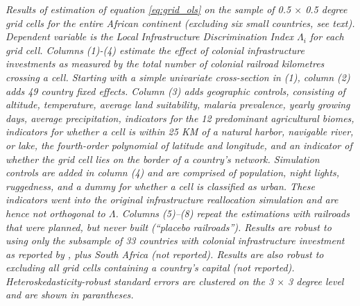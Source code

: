 \documentclass[11pt, oneside]{article}   	%
\newcommand{\mysubcaption}[1]{
\justify
\begin{spacing}{0.7}
\textit{\footnotesize #1}
\end{spacing}}
\begin{document}
\begin{table}[t]
\mysubcaption{Results of estimation of equation \eqref{eq:grid_ols} on the sample of 0.5 $\times$ 0.5 degree grid cells for the entire African continent (excluding six small countries, see text). Dependent variable is the Local Infrastructure Discrimination Index $\Lambda_{i}$ for each grid cell. Columns (1)-(4) estimate the effect of colonial infrastructure investments as measured by the total number of colonial railroad kilometres crossing a cell. Starting with a simple univariate cross-section in (1), column (2) adds 49 country fixed effects. Column (3) adds geographic controls, consisting of altitude, temperature, average land suitability, malaria prevalence, yearly growing days, average precipitation, indicators for the 12 predominant agricultural biomes, indicators for whether a cell is within 25 KM of a natural harbor, navigable river, or lake, the fourth-order polynomial of latitude and longitude, and an indicator of whether the grid cell lies on the border of a country's network. Simulation controls are added in column (4) and are comprised of population, night lights, ruggedness, and a dummy for whether a cell is classified as urban. These indicators went into the original infrastructure reallocation simulation and are hence not orthogonal to $\Lambda$. Columns (5)--(8) repeat the estimations with railroads that were planned, but never built (``placebo railroads''). Results are robust to using only the subsample of 33 countries with colonial infrastructure investment as reported by \cite{jedwab_permanent_2016}, plus South Africa (not reported). Results are also robust to excluding all grid cells containing a country's capital (not reported). Heteroskedasticity-robust standard errors are clustered on the 3 $\times$ 3 degree level and are shown in parantheses.}
\end{table}
\end{document}
